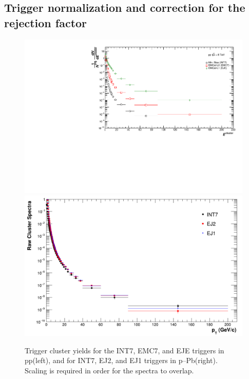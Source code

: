 \documentclass[ALICE]{ALICE_analysis_notes}
\newcommand{\pPb}{{\mbox{p--Pb}}\xspace}
\newcommand{\pp}{pp\xspace}
\providecommand{\DIFaddend}{} %
\DeclareRobustCommand{\DIFaddend}{\DIFOaddend \let\includegraphics\DIFOincludegraphics} %
\begin{document}
\DIFaddend \subsection{Trigger normalization and correction for the rejection factor}
\label{sec:triggerCorrection}

\begin{figure}
    \centering
    \includegraphics[width=15cm]{figures/TriggerClusters/clusters_R02.pdf}
    \includegraphics[width=15cm]{figures/pPbFigures/TriggerClusters/rawclusterspectra_alltriggers_R02.png}
    \caption{Trigger cluster yields for the INT7, EMC7, and EJE triggers in \pp (left), and for INT7, EJ2, and EJ1 triggers in \pPb (right). Scaling is required in order for the spectra to overlap.}
    \label{fig:triggerClusters}
\end{figure}
\end{document}

